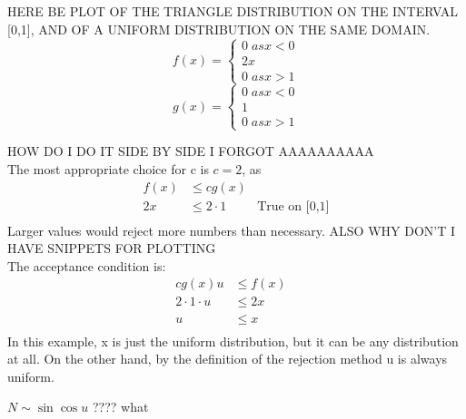 {
    HERE BE PLOT OF THE TRIANGLE DISTRIBUTION ON THE INTERVAL [0,1], AND OF A UNIFORM DISTRIBUTION ON THE SAME DOMAIN.
    \begin{equation}
        f(x) = \begin{cases}
            0 \; as x < 0\\
            2x \\
            0 \; as x > 1 
        \end{cases}
    \end{equation}
    \begin{equation}
        g(x) = \begin{cases}
            0 \; as x < 0\\
            1 \\
            0 \; as x > 1 
        \end{cases}
    \end{equation}
 
    HOW DO I DO IT SIDE BY SIDE I FORGOT AAAAAAAAAA\\
    The most appropriate choice for c is $c=2$, as
     \begin{equation}
        \begin{aligned}
            f(x)&\le cg(x)&\mbox{}\\[1.25ex]
            2x  &\le 2\cdot 1&\mbox{True on [0,1]}\\[1.25ex]
        \end{aligned}
    \end{equation}
    Larger values would reject more numbers than necessary.
    ALSO WHY DON'T I HAVE SNIPPETS FOR PLOTTING\\
    The acceptance condition is:
    \begin{equation}
        \begin{aligned}
            cg(x)u&\le f(x)&\mbox{}\\[1.25ex]
            2 \cdot 1 \cdot u&\le 2x&\mbox{}\\[1.25ex]
            u&\le x&\mbox{}\\[1.25ex]
            
        \end{aligned}
    \end{equation}
    \nt
    {
        In this example, x is just the uniform distribution, but it can be any distribution at all. On the other hand, by the definition of the rejection method u is always uniform.
    }

    \nt
    {
        $N \sim \sin \cos{u}$ ???? what
    }
}
